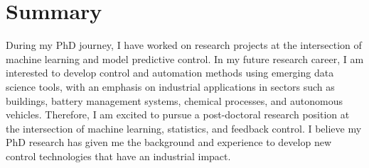 \documentclass[11pt, a4paper]{article} %
\begin{document}
\section*{Summary}

During my PhD journey, I have worked on research projects at the intersection of
machine learning and model predictive control. In my future research career, I
am interested to develop control and automation methods using emerging data
science tools, with an emphasis on industrial applications in sectors such as
buildings, battery management systems, chemical processes, and autonomous
vehicles. Therefore, I am excited to pursue a post-doctoral research position at
the intersection of machine learning, statistics, and feedback control. I
believe my PhD research has given me the background and experience to develop
new control technologies that have an industrial impact.  
%
%
%
\end{document}
